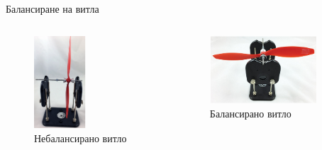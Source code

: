 \documentclass[handout]{beamer}
\begin{document}
\begin{frame}{Балансиране на витла}
	\begin{columns}
	\begin{figure}[htpb!]
		\centering
		\includegraphics[width=0.5\textwidth]{Images/prop_on_balance.png}
		\caption{Небалансирано витло}
	\end{figure}


	\begin{figure}[htpb!]
		\centering
		\includegraphics[width=0.85\textwidth]{Images/prop_balanced.png}
		\caption{Балансирано витло}
	\end{figure}
\end{columns}
\end{frame}
\end{document}
